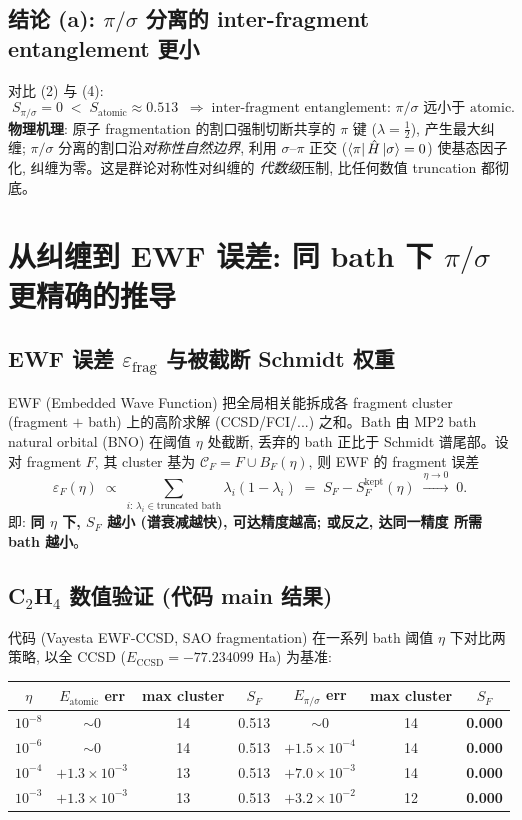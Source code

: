 \documentclass[11pt]{article}
\newcommand{\eps}{\varepsilon}
\newcommand{\sig}{\sigma}
\begin{document}
\subsection{结论 (a): $\pi/\sigma$ 分离的 inter-fragment entanglement 更小}
对比 (2) 与 (4):
\[
  \boxed{\;S_{\pi/\sig}=0 \;<\; S_{\text{atomic}}\approx0.513\;}
  \;\Longrightarrow\;
  \text{inter-fragment entanglement: }\pi/\sig \text{ 远小于 atomic.}
\]
\textbf{物理机理}: 原子 fragmentation 的割口强制切断共享的 $\pi$ 键 ($\lambda=\tfrac12$),
产生最大纠缠; $\pi/\sig$ 分离的割口沿\emph{对称性自然边界}, 利用 $\sig$--$\pi$ 正交
($\bra{\pi}\hat H\ket{\sig}=0$) 使基态因子化, 纠缠为零。这是群论对称性对纠缠的
\emph{代数级}压制, 比任何数值 truncation 都彻底。

\section{从纠缠到 EWF 误差: 同 bath 下 $\pi/\sig$ 更精确的推导}

\subsection{EWF 误差 $\eps_{\mathrm{frag}}$ 与被截断 Schmidt 权重}
EWF (Embedded Wave Function) 把全局相关能拆成各 fragment cluster (fragment $+$ bath)
上的高阶求解 (CCSD/FCI/...) 之和。Bath 由 MP2 bath natural orbital (BNO) 在阈值
$\eta$ 处截断, 丢弃的 bath 正比于 Schmidt 谱尾部。设对 fragment $F$, 其 cluster 基为
$\mathcal{C}_F=F\cup B_F(\eta)$, 则 EWF 的 fragment 误差
\[
  \eps_F(\eta)\;\propto\;\sum_{i:\,\lambda_i\in\text{truncated bath}}\lambda_i(1-\lambda_i)
  \;=\;S_F - S_F^{\mathrm{kept}}(\eta)
  \;\xrightarrow{\eta\to0}\;0.
  \tag{5}
\]
即: \textbf{同 $\eta$ 下, $S_F$ 越小 (谱衰减越快), 可达精度越高; 或反之, 达同一精度
所需 bath 越小}。

\subsection{C$_2$H$_4$ 数值验证 (代码 main 结果)}
代码 (Vayesta EWF-CCSD, SAO fragmentation) 在一系列 bath 阈值 $\eta$ 下对比两策略,
以全 CCSD ($E_{\mathrm{CCSD}}=-77.234099$ Ha) 为基准:
\begin{center}
\begin{tabular}{c|ccc|ccc}
$\eta$ & $E_{\text{atomic}}$ err & max cluster & $S_F$ &
        $E_{\pi/\sig}$ err & max cluster & $S_F$\\
\hline
$10^{-8}$ & $\sim0$ & 14 & 0.513 & $\sim0$ & 14 & \textbf{0.000}\\
$10^{-6}$ & $\sim0$ & 14 & 0.513 & $+1.5{\times}10^{-4}$ & 14 & \textbf{0.000}\\
$10^{-4}$ & $+1.3{\times}10^{-3}$ & 13 & 0.513 & $+7.0{\times}10^{-3}$ & 14 & \textbf{0.000}\\
$10^{-3}$ & $+1.3{\times}10^{-3}$ & 13 & 0.513 & $+3.2{\times}10^{-2}$ & 12 & \textbf{0.000}
\end{tabular}
\end{center}
\end{document}
